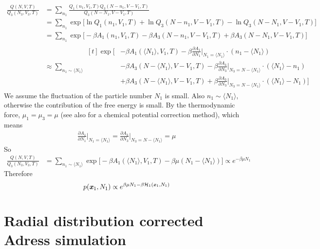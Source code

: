 \documentclass[aps,pre,preprint,unsortedaddress]{revtex4}
\renewcommand{\v}[1]{\textbf{\textit{#1}}}
\begin{document}
\begin{align}\nonumber
  \frac{Q(N,V,T)}{Q_3(N_3,V_3,T)}
  &=
  \sum_{n_1}
  \frac{Q_1(n_1,V_1,T)Q_3(N - n_1,V - V_1,T)}{Q_3(N - N_1,V - V_1,T)}\\ \nonumber
  &=
  \sum_{n_1}
  \exp\bigg[
  \ln Q_1(n_1,V_1,T) + \ln Q_3(N - n_1,V - V_1,T) -
  \ln Q_3(N - N_1,V - V_1,T)
  \bigg] \\\nonumber
  &=
  \sum_{n_1}
  \exp\bigg[
  -\beta A_1(n_1,V_1,T) 
  -\beta A_3(N - n_1,V - V_1,T)
  +\beta A_3(N - N_1,V - V_1,T)  
  \bigg] \\\nonumber
  &\approx
  \sum_{n_1\sim \langle N_1\rangle}
  \begin{aligned}[t]
    \exp\bigg[
    &
    -\beta A_1(\langle N_1\rangle,V_1,T) 
    -\beta \frac{\partial A_1}{\partial N_1}\bigg\vert_{N_1=\langle N_1\rangle}
    \cdot(n_1 - \langle N_1\rangle) \\
    &
    -\beta A_3(N - \langle N_1\rangle,V - V_1,T)
    -\beta \frac{\partial A_3}{\partial N_3}\bigg\vert_{N_3 = N-\langle N_1\rangle}
    \cdot(\langle N_1\rangle - n_1) \\    
    &
    +\beta A_3(N - \langle N_1\rangle,V - V_1,T)
    +\beta \frac{\partial A_3}{\partial N_3}\bigg\vert_{N_3 = N-\langle N_1\rangle}
    \cdot(\langle N_1\rangle - N_1) 
    \bigg]
  \end{aligned}
\end{align}
We assume the fluctuation of the particle number $N_1$ is small. Also
$n_1\sim \langle N_1\rangle$, otherwise the contribution of the free
energy is small.  By the thermodynamic force, $\mu_1 = \mu_3 = \mu$
(see also \cite{poblete2010coupling} for a chemical potential
correction method), which means
\begin{align}
  \frac{\partial A_1}{\partial N_1}\bigg\vert_{N_1=\langle N_1\rangle}
  =
  \frac{\partial A_3}{\partial N_3}\bigg\vert_{N_3= N-\langle N_1\rangle}
  = \mu
\end{align}
So
\begin{align}\nonumber
  \frac{Q(N,V,T)}{Q_3(N_3,V_3,T)}
  &=
  \sum_{n_1\sim \langle N_1\rangle}
  \exp\big[
  -\beta A_1(\langle N_1\rangle,V_1,T) 
  -\beta\mu(N_1 - \langle N_1\rangle)
  \big]
  \propto
  e^{-\beta\mu N_1}
\end{align}
Therefore
\begin{align}
  p(\v x_1, N_1) \propto e^{\beta\mu N_1 -\beta\mathcal H_1(\v x_1, N_1)}
\end{align}


\section{Radial distribution corrected Adress simulation}
\end{document}
